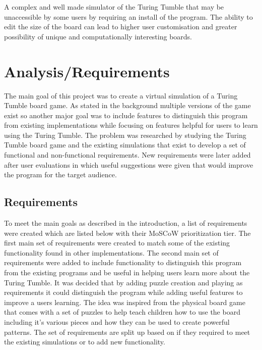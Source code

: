 \documentclass{l4proj}
\begin{document}
A complex and well made simulator of the Turing Tumble that may be unaccessible by some users by requiring an install of the program. The ability to edit the size of the board can lead to higher user customisation and greater possibility of unique and computationally interesting boards. 
\chapter{Analysis/Requirements}




The main goal of this project was to create a virtual simulation of a Turing Tumble board game. As stated in the background multiple versions of the game exist so another major goal was to include features to distinguish this program from existing implementations while focusing on features helpful for users to learn using the Turing Tumble. The problem was researched by studying the Turing Tumble board game and the existing simulations that exist to develop a set of functional and non-functional requirements. New requirements were later added after user evaluations in which useful suggestions were given that would improve the program for the target audience.

\section{Requirements}
To meet the main goals as described in the introduction, a list of requirements were created which are listed below with their MoSCoW \cite{noauthor_moscow_nodate} prioritization tier. The first main set of requirements were created to match some of the existing functionality found in other implementations. The second main set of requirements were added to include functionality to distinguish this program from the existing programs and be useful in helping users learn more about the Turing Tumble. It was decided that by adding puzzle creation and playing as requirements it could distinguish the program while adding useful features to improve a users learning. The idea was inspired from the physical board game that comes with a set of puzzles to help teach children how to use the board including it's various pieces and how they can be used to create powerful patterns. The set of requirements are split up based on if they required to meet the existing simulations or to add new functionality.
\end{document}

